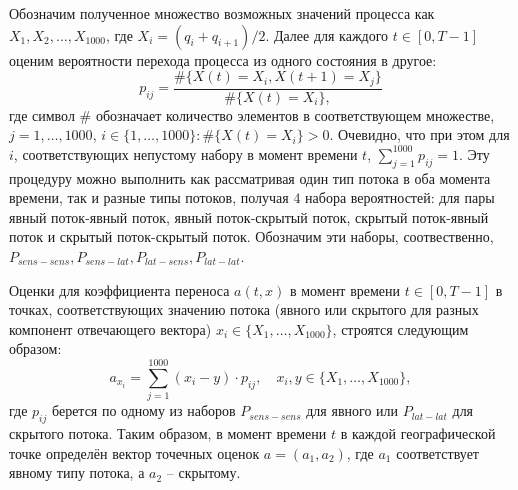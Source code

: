 Обозначим полученное множество возможных значений процесса как $X_1, X_2, \dots, X_{1000}$, где $X_i = (q_i + q_{i+1})/2$. Далее для каждого $t \in [0, T-1]$ оценим вероятности перехода процесса из одного состояния в другое:
\begin{equation}
	\label{eq:p_formula}
	p_{ij} = \frac{\#\{X(t) = X_i, X(t+1) = X_j\}}{\#\{X(t) = X_i\},}
\end{equation}
где символ $\#$ обозначает количество элементов в соответствующем множестве, $j = 1,\ldots,1000$, $i \in \{1, \dots, 1000\}: \#\{X(t) = X_i\} > 0$. Очевидно, что при этом для $i$, соответствующих непустому набору в момент времени $t$, $\sum\limits_{j=1}^{1000} p_{ij} = 1$. Эту процедуру можно выполнить как рассматривая один тип потока в оба момента времени, так и разные типы потоков, получая $4$ набора вероятностей: для пары явный поток-явный поток, явный поток-скрытый поток, скрытый поток-явный поток и скрытый поток-скрытый поток. Обозначим эти наборы, соотвественно, $P_{sens-sens}, P_{sens-lat}, P_{lat-sens}, P_{lat-lat}$. 

Оценки для коэффициента переноса $a(t,x)$ в момент времени $t \in [0, T-1]$ в точках, соответствующих значению потока (явного или скрытого для разных компонент отвечающего вектора) $x_i \in \{X_1, \dots, X_{1000}\}$, строятся следующим образом:  
\begin{equation}
	\label{eq:a_formula}
	a_{x_i} = \sum\limits_{j=1}^{1000} (x_i - y)\cdot p_{ij}, \quad x_i, y \in \{X_1, \dots, X_{1000}\}, 
\end{equation}
где $p_{ij}$ берется по одному из наборов $P_{sens-sens}$ для явного или $P_{lat-lat}$ для скрытого потока. Таким образом, в момент времени $t$ в каждой географической точке определён вектор точечных оценок $a = (a_1, a_2)$, где $a_1$ соответствует явному типу потока, а $a_2$ -- скрытому.

